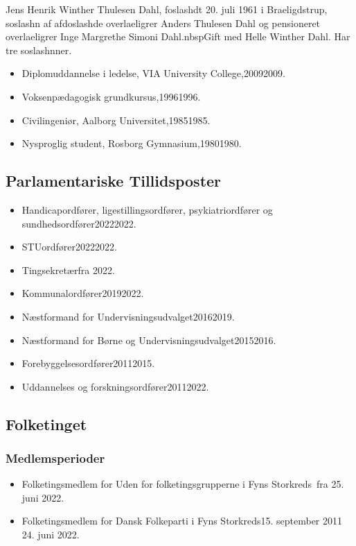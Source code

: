 \documentclass[11pt, a4paper]{awesome-cv}
\begin{document}
\makecvheader[R]
\makelettertitle
\begin{cvletter}
Jens Henrik Winther Thulesen Dahl, foslashdt 20. juli 1961 i Braeligdstrup, soslashn af afdoslashde overlaeligrer Anders Thulesen Dahl og pensioneret overlaeligrer Inge Margrethe Simoni Dahl.nbspGift med Helle Winther Dahl. Har tre soslashnner.

\begin{itemize}
\item Diplomuddannelse i ledelse, VIA University College,20092009.
\item Voksenpædagogisk grundkursus,19961996.
\item Civilingeniør, Aalborg Universitet,19851985.
\item Nysproglig student, Rosborg Gymnasium,19801980.
\end{itemize}
\subsection*{Parlamentariske Tillidsposter}
\begin{itemize}
\item Handicapordfører, ligestillingsordfører, psykiatriordfører og sundhedsordfører20222022.
\item STUordfører20222022.
\item Tingsekretærfra 2022.
\item Kommunalordfører20192022.
\item Næstformand for Undervisningsudvalget20162019.
\item Næstformand for Børne og Undervisningsudvalget20152016.
\item Forebyggelsesordfører20112015.
\item Uddannelses og forskningsordfører20112022.
\end{itemize}
\subsection*{Folketinget}
\subsubsection*{Medlemsperioder}
\begin{itemize}
\item Folketingsmedlem for Uden for folketingsgrupperne i Fyns Storkreds fra 25. juni 2022.
\item Folketingsmedlem for Dansk Folkeparti i Fyns Storkreds15. september 2011  24. juni 2022.
\end{itemize}

\end{cvletter}
\end{document}
